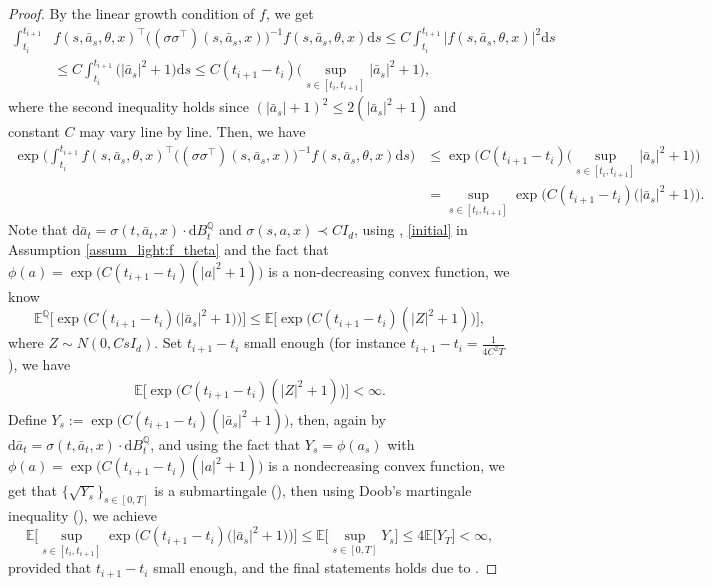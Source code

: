 \documentclass{article}
\newcommand{\1}{\mathbbm{1}}
\numberwithin{equation}{section}
\def\d{{\mathrm{d}}}
\def\sE{{\mathbb{E}}}
\def\sQ{{\mathbb{Q}}}
\begin{document}
\begin{proof}
    By the linear growth condition of $f$, we get
    \begin{align*}
        \int_{t_i}^{t_{i+1}}&f(s, \bar a_s,\theta,x)^\top\big((\sigma\sigma^\top)(s,\bar a_s,x)\big)^{-1}f(s, \bar a_s,\theta,x)\d s\leq C\int_{t_i}^{t_{i+1}}\big|f(s, \bar a_s,\theta,x)\big|^2\d s
        \\
        &\leq C\int_{t_i}^{t_{i+1}}\big(|\bar a_s|^2+1\big)\d s\leq C(t_{i+1}-t_{i})\Big(\sup_{s\in[t_i,t_{i+1}]}|\bar a_s|^2+1\Big),
    \end{align*}
    where the second inequality holds since $(|\bar a_s|+1)^2\leq 2(|\bar a_s|^2+1)$ and constant $C$ may vary line by line. Then, we have
    \begin{align*}
    \exp\bigg(\int_{t_i}^{t_{i+1}}f(s, \bar a_s,\theta,x)^\top\big((\sigma\sigma^\top)(s,\bar a_s,x)\big)^{-1}f(s, \bar a_s,\theta,x)\d s\bigg)&\leq \exp\bigg(C(t_{i+1}-t_{i})\Big(\sup_{s\in[t_i,t_{i+1}]}|\bar a_s|^2+1\Big)\bigg)
    \\
    &=\sup_{s\in[t_i,t_{i+1}]}\exp\Big(C(t_{i+1}-t_i)\big(|\bar a_s|^2+1\big)\Big).
    \end{align*}
    Note that $\d\bar a_t=\sigma(t,\bar a_t,x) \cdot\d B_t^\sQ$ and $\sigma(s,a,x)\prec CI_d$, using \cite[Theorem 1.3]{hajek1985mean}, \eqref{initial} in Assumption \ref{assum_light:f_theta} and the fact that $\phi(a)=\exp\big(C(t_{i+1}-t_{i})(|a|^2+1)\big)$ is a non-decreasing convex function, we know 
    $$
        \sE^\sQ\Big[\exp\Big(C(t_{i+1}-t_i)\big(|\bar a_s|^2+1\big)\Big)\Big]\leq \sE\big[\exp\big(C(t_{i+1}-t_i)(|Z|^2+1)\big)\big],
    $$
    where $Z\sim N(0,CsI_d)$. Set $t_{i+1}-t_i$ small enough (for instance $t_{i+1}-t_i= \frac1{4C^2T}$), we have
    \begin{align*}
    \sE\big[\exp\big(C(t_{i+1}-t_i)(|Z|^2+1)\big)\big]<\infty.
    \end{align*}
    Define $Y_s:=\exp\big(C(t_{i+1}-t_i)(|\bar a_s|^2+1)\big)$, then,
    again by $\d\bar a_t=\sigma(t,\bar a_t,x) \cdot\d B_t^\sQ$, and using the fact that $Y_s=\phi(a_s)$ with $\phi(a)=\exp\big(C(t_{i+1}-t_{i})(|a|^2+1)\big)$ is a nondecreasing convex function, we get that $\{\sqrt{Y_s}\}_{s\in[0,T]}$ is a submartingale (\cite[Problem 3.7 in Chapter 1]{karatzas1991brownian}), then using Doob's martingale inequality (\cite[Theorem 3.8 in Chapter 1]{karatzas1991brownian}), we achieve
    $$
        \sE\bigg[\sup_{s\in[t_i,t_{i+1}]}\exp\Big(C(t_{i+1}-t_i)\big(|\bar a_s|^2+1\big)\Big)\bigg]\leq \sE\Big[\sup_{s\in[0,T]}Y_s\Big]\leq 4\sE\big[Y_T\big]<\infty,
    $$
    provided that $t_{i+1}-t_i $ small enough, and the final statements holds due to \cite[Corollary 5.14 in Chapter 3]{karatzas1991brownian}.
\end{proof}
\end{document}
